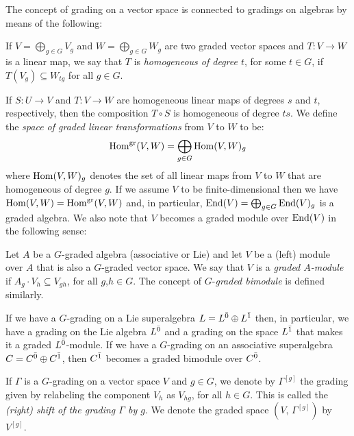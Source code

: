 The concept of grading on a vector space is connected to gradings on algebras by means of the following:

\begin{defi}
	If $V=\bigoplus_{g\in G} V_{g}$ and $W=\bigoplus_{g\in G} W_{g}$ are two graded vector spaces and $T: V\rightarrow W$ is a linear map, we say that $T$ is \emph{homogeneous of degree $t$}, for some $t\in G$, if $T(V_g)\subseteq W_{tg}$ for all $g\in G$.
\end{defi}

If $S: U\rightarrow V$ and $T: V\rightarrow W$ are homogeneous linear maps of degrees $s$ and $t$, respectively, 
then the composition $T\circ S$ is homogeneous of degree $ts$.
We define the {\em space of graded linear transformations} from $V$ to $W$ to be:
%
\[ \operatorname{Hom}^{\text{gr}} (V,W) = \bigoplus_{g\in G} \operatorname{Hom} (V,W)_{g}\]
%
where $\operatorname{Hom} (V,W)_{g}$ denotes the set of all linear maps from $V$ to $W$ that are homogeneous of degree $g$. 
If we assume $V$ to be finite-dimensional then we have $\operatorname{Hom}(V,W)=\operatorname{Hom}^{\text{gr}}(V,W)$ and, in particular, $\operatorname{End} (V) = \bigoplus_{g\in G} \operatorname{End} (V)_g$ is a graded algebra.
We also note that $V$ becomes a graded module over $\operatorname{End}(V)$ in the following sense:

\begin{defi}
	Let $A$ be a $G$-graded algebra (associative or Lie) and let $V$ be a (left) module over $A$ that is also a $G$-graded vector space. We say that $V$ is a \emph{graded $A$-module} if $A_g \cdot V_h \subseteq V_{gh}$, for all $g$,$h\in G$. The concept of $G$-\emph{graded bimodule} is defined similarly.
\end{defi}

If we have a $G$-grading on a Lie superalgebra $L=L^{\bar0} \oplus L^{\bar1}$ then, in particular, we have a grading on the Lie algebra $L^{\bar0}$ and a grading on the space $L^{\bar1}$ that makes it a graded $L^{\bar0}$-module. If we have a $G$-grading on an associative superalgebra $C=C^{\bar0} \oplus C^{\bar1}$, then $C^{\bar1}$ becomes a graded bimodule over $C^{\bar0}$.

If $ \Gamma$ is a $G$-grading on a vector space $V$ and $g\in G$, we denote by $\Gamma^{[g]} $ the grading given by relabeling the component 
$V_h$ as $V_{hg}$, for all $h \in G$. This is called the \emph{(right) shift of the grading $\Gamma$ by $g$}. 
We denote the graded space $(V, \,  \Gamma^{[g]})$ by $V^{[g]}$.

